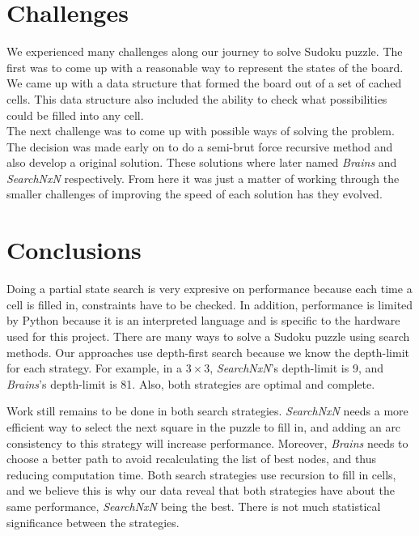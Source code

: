 \documentclass[letterpaper]{article}
\begin{document}
\section{Challenges}
We experienced many challenges along our journey to solve Sudoku puzzle. The first was to come up with a reasonable way to represent the states of the board. We came up with a data structure that formed the board out of a set of cached cells. This data structure also included the ability to check what possibilities could be filled into any cell. \\

The next challenge was to come up with possible ways of solving the problem. The decision was made early on to do a semi-brut force recursive method and also develop a original solution. These solutions where later named \emph{Brains} and \emph{SearchNxN} respectively. From here it was just a matter of working through the smaller challenges of improving the speed of each solution has they evolved.

\section{Conclusions}
Doing a partial state search is very expresive on performance because each time a cell is filled in, constraints have to be checked. In addition, performance is limited by Python because it is an interpreted language and is specific to the hardware used for this project. There are many ways to solve a Sudoku puzzle using search methods. Our approaches use depth-first search because we know the depth-limit for each strategy. For example, in a $3 \times 3$, \emph{SearchNxN}'s depth-limit is 9, and \emph{Brains}'s depth-limit is 81. Also, both strategies are optimal and complete. 

Work still remains to be done in both search strategies. \emph{SearchNxN} needs a more efficient way to select the next square in the puzzle to fill in, and adding an arc consistency to this strategy will increase performance. Moreover, \emph{Brains} needs to choose a better path to avoid recalculating the list of best nodes, and thus reducing computation time. Both search strategies use recursion to fill in cells, and we believe this is why our data reveal that both strategies have about the same performance, \emph{SearchNxN} being the best. There is not much statistical significance between the strategies.
\end{document}
